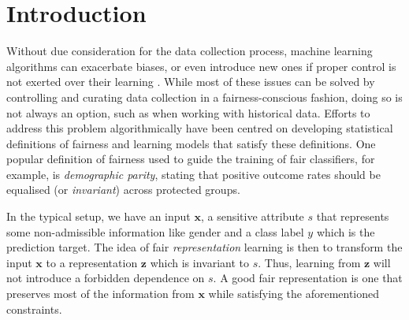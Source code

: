 \section{Introduction}

Without due consideration for the data collection process, machine learning algorithms can exacerbate biases, or even introduce new ones if proper control is not exerted over their learning \citep{holstein2019improving}. 
While most of these issues can be solved by
controlling and curating data collection in a fairness-conscious fashion, 
doing so is not always an option, such as when working with historical data.
Efforts to address this problem algorithmically have been centred on developing statistical definitions of fairness and learning models that satisfy these definitions.
One popular definition of fairness used to guide the training of fair classifiers, for example, is \emph{demographic parity}, stating that positive outcome rates should be equalised (or \emph{invariant}) across protected groups.

In the typical setup, we have an input $\bm{x}$, a sensitive attribute $s$ that represents some non-admissible information like gender
and a class label $y$ which is the prediction target.
The idea of fair \emph{representation} learning \citep{zemel2013learning,edwards2016censoring,madras2018learning}
is then to transform the input $\bm{x}$ to a representation $\bm{z}$ which is invariant to $s$.
Thus, learning from $\bm{z}$ will not introduce a forbidden dependence on $s$.
A good fair representation is one that preserves most of the information from $\bm{x}$ while satisfying the aforementioned constraints.

